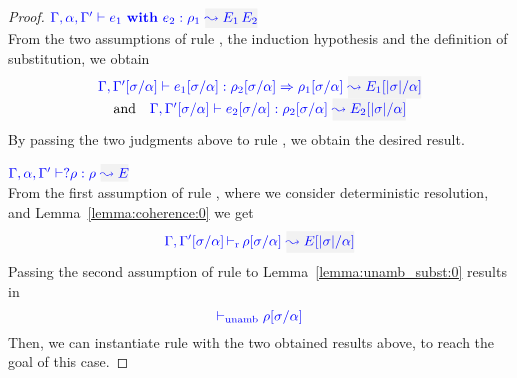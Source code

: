 \begin{proof}
\item[\fbox{\rref{Ty-IApp}}]\quad$\wte{\tenv,\alpha,\tenv'}{\ruleapp{e_1}{e_2}}{\rulet_1}{\mmapp{E_1}{E_2}}$\\

From the two assumptions of rule , the induction hypothesis and the definition of
substitution, we obtain
\begin{equation*}
\begin{array}{c}
\wte{\tenv,\tenv'[\suty/\alpha]}{e_1[\suty/\alpha]}{\rulet_2[\suty/\alpha]\To\rulet_1[\suty/\alpha]}{E_1[\etrans{\suty}/\alpha]}\\
\text{and}\quad\wte{\tenv,\tenv'[\suty/\alpha]}{e_2[\suty/\alpha]}{\rulet_2[\suty/\alpha]}{E_2[\etrans{\suty}/\alpha]}
\end{array}
\end{equation*}
By passing the two judgments above to rule , we obtain the desired result.\\

\item[\fbox{\rref{Ty-Query}}]\quad$\wte{\tenv,\alpha,\tenv'}{?\rulet}{\rulet}{E}$\\

From the first assumption of rule , where we consider deterministic
resolution, and Lemma~\ref{lemma:coherence:0} we get
\begin{equation*}
\dres{\tenv,\tenv'[\suty/\alpha]}{\rulet[\suty/\alpha]}{E[\etrans{\suty}/\alpha]}
\end{equation*}
Passing the second assumption of rule  to Lemma~\ref{lemma:unamb_subst:0}
results in
\begin{equation*}
{\color{blue}  \vdash_{\mathrm{unamb}}\rho[\sigma/\alpha]}
\end{equation*}
Then, we can instantiate rule  with the two obtained results above,
to reach the goal of this case.
\end{proof}

